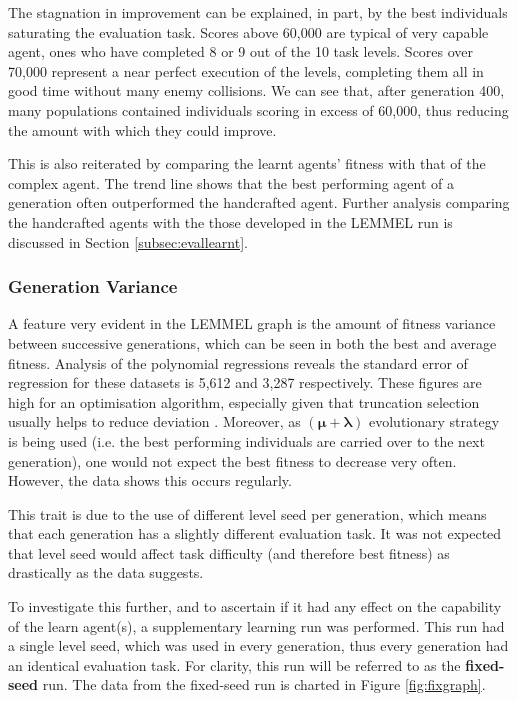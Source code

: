The stagnation in improvement can be explained, in part, by the best individuals saturating the evaluation task. Scores above 60,000 are typical of very capable agent, ones who have completed 8 or 9 out of the 10 task levels. Scores over 70,000 represent a near perfect execution of the levels, completing them all in good time without many enemy collisions. We can see that, after generation 400, many populations contained individuals scoring in excess of 60,000, thus reducing the amount with which they could improve.

This is also reiterated by comparing the learnt agents' fitness with that of the complex agent. The trend line shows that the best performing agent of a generation often outperformed the handcrafted agent. Further analysis comparing the handcrafted agents with the those developed in the LEMMEL run is discussed in Section \ref{subsec:evallearnt}.


\subsubsection{Generation Variance}

A feature very evident in the LEMMEL graph is the amount of fitness variance between successive generations, which can be seen in both the best and average fitness. Analysis of the polynomial regressions reveals the standard error of regression for these datasets is 5,612 and 3,287 respectively. These figures are high for an optimisation algorithm, especially given that truncation selection usually helps to reduce deviation \cite[s.~3.8.3]{geatbx}. Moreover, as $\pmb{(\mu  + \lambda)}$ evolutionary strategy is being used (i.e. the best performing individuals are carried over to the next generation), one would not expect the best fitness to decrease very often. However, the data shows this occurs regularly.

This trait is due to the use of different level seed per generation, which means that each generation has a slightly different evaluation task. It was not expected that level seed would affect task difficulty (and therefore best fitness) as drastically as the data suggests.

To investigate this further, and to ascertain if it had any effect on the capability of the learn agent(s), a supplementary learning run was performed. This run had a single level seed, which was used in every generation, thus every generation had an identical evaluation task. For clarity, this run will be referred to as the \textbf{fixed-seed} run. The data from the fixed-seed run is charted in Figure \ref{fig:fixgraph}.

